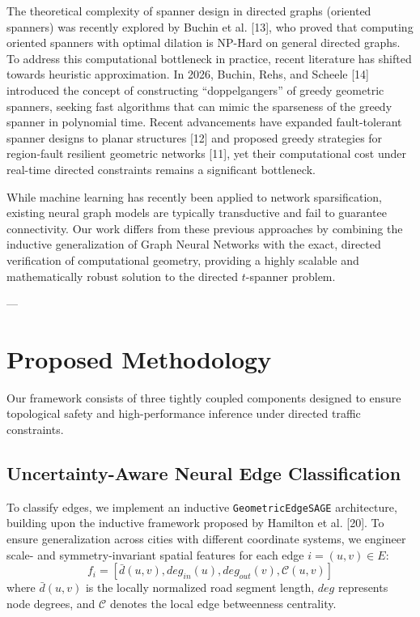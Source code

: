 \documentclass[journal]{IEEEtran}
\begin{document}
The theoretical complexity of spanner design in directed graphs (oriented spanners) was recently explored by Buchin et al. [13], who proved that computing oriented spanners with optimal dilation is NP-Hard on general directed graphs. To address this computational bottleneck in practice, recent literature has shifted towards heuristic approximation. In 2026, Buchin, Rehs, and Scheele [14] introduced the concept of constructing ``doppelgangers'' of greedy geometric spanners, seeking fast algorithms that can mimic the sparseness of the greedy spanner in polynomial time. Recent advancements have expanded fault-tolerant spanner designs to planar structures [12] and proposed greedy strategies for region-fault resilient geometric networks [11], yet their computational cost under real-time directed constraints remains a significant bottleneck.

While machine learning has recently been applied to network sparsification, existing neural graph models are typically transductive and fail to guarantee connectivity. Our work differs from these previous approaches by combining the inductive generalization of Graph Neural Networks with the exact, directed verification of computational geometry, providing a highly scalable and mathematically robust solution to the directed $t$-spanner problem.

---

\section{Proposed Methodology}

Our framework consists of three tightly coupled components designed to ensure topological safety and high-performance inference under directed traffic constraints.

\subsection{Uncertainty-Aware Neural Edge Classification}
To classify edges, we implement an inductive \texttt{GeometricEdgeSAGE} architecture, building upon the inductive framework proposed by Hamilton et al. [20]. To ensure generalization across cities with different coordinate systems, we engineer scale- and symmetry-invariant spatial features for each edge $i = (u, v) \in E$:
\begin{equation}
    f_i = \left[ \bar{d}(u,v), deg_{in}(u), deg_{out}(v), \mathcal{C}(u, v) \right]
\end{equation}
where $\bar{d}(u, v)$ is the locally normalized road segment length, $deg$ represents node degrees, and $\mathcal{C}$ denotes the local edge betweenness centrality.
\end{document}
